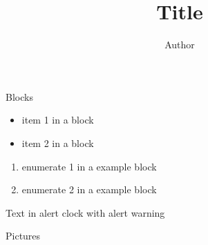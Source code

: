 \documentclass[8pt]{beamer}
\title{Title}
\author{Author}
\begin{document}
\begin{frame}
  \titlepage
\end{frame}


\begin{frame}{Blocks}

  \begin{block}{}
    \begin{itemize}
    \item item 1 in a block
    \item item 2 in a block
    \end{itemize}
  \end{block}

  \begin{exampleblock}{}
    \begin{enumerate}
    \item enumerate 1 in a example block
    \item enumerate 2 in a example block
    \end{enumerate}
  \end{exampleblock}

  \begin{alertblock}{}
    Text in alert clock with \alert{alert warning}
  \end{alertblock}

\end{frame}

\begin{frame}{Pictures}


\end{frame}
\end{document}
